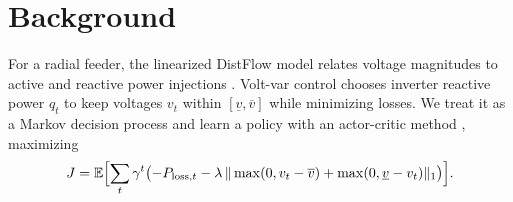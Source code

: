 \chapter{Background}
\label{ch:background}

For a radial feeder, the linearized DistFlow model relates voltage magnitudes to active and
reactive power injections \citep{baran1989}. Volt-var control chooses inverter reactive power
$q_t$ to keep voltages $v_t$ within $[\underline{v}, \overline{v}]$ while minimizing losses.
We treat it as a Markov decision process and learn a policy with an actor-critic method
\citep{lillicrap2016}, maximizing
\begin{equation}
  J = \mathbb{E}\Bigl[\sum_{t} \gamma^{t} \bigl(-P_{\mathrm{loss},t} - \lambda\,
  \|\max(0, v_t - \overline{v}) + \max(0, \underline{v} - v_t)\|_1\bigr)\Bigr].
  \label{eq:reward}
\end{equation}
